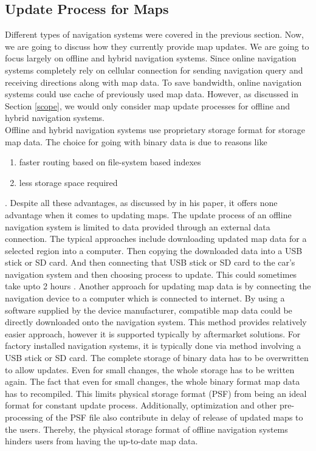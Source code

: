 \subsection{Update Process for Maps} \label{existingUpdate}
Different types of navigation systems were covered in the previous section. Now, we are going to discuss how they currently provide map updates. We are going to focus largely on offline and hybrid navigation systems. Since online navigation systems completely rely on cellular connection for sending navigation query and receiving directions along with map data. To save bandwidth, online navigation systems could use cache of previously used map data. However, as discussed in Section \ref{scope}, we would only consider map update processes for offline and hybrid navigation systems. \\

Offline and hybrid navigation systems use proprietary storage format for storage map data. The choice for going with binary data is due to reasons like
\begin{enumerate}
\item faster routing based on file-system based indexes
\item less storage space required
\end{enumerate}
. Despite all these advantages, as discussed by \citet{min2008mobile} in his paper, it offers none advantage when it comes to updating maps. The update process of an offline navigation system is limited to data provided through an external data connection. The typical approaches include downloading updated map data for a selected region into a computer. Then copying the downloaded data into a USB stick or SD card. And then connecting that USB stick or SD card to the car's navigation system and then choosing process to update. This could sometimes take upto 2 hours \cite{garminupdate}. Another approach for updating map data is by connecting the navigation device to a computer which is connected to internet. By using a software supplied by the device manufacturer, compatible map data could be directly downloaded onto the navigation system. This method provides relatively easier approach, however it is supported typically by aftermarket solutions. For factory installed navigation systems, it is typically done via method involving a USB stick or SD card. The complete storage of binary data has to be overwritten to allow updates. Even for small changes, the whole storage has to be written again. The fact that even for small changes, the whole binary format map data has to recompiled. This limits physical storage format (PSF) from being an ideal format for constant update process. Additionally, optimization and other pre-processing of the PSF file also contribute in delay of release of updated maps to the users. Thereby, the physical storage format of offline navigation systems hinders users from having the up-to-date map data. 
\\

